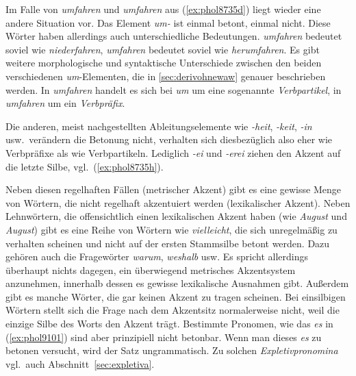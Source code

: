 \begin{exe}
  \ex\label{ex:fokuskomp}
  \begin{xlist}
  \end{xlist}
\end{exe}

Im Falle von \textit{\Akz umfahren} und \textit{um\Akz fahren} aus (\ref{ex:phol8735d}) liegt wieder eine andere Situation vor.
Das Element \textit{um-} ist einmal betont, einmal nicht.
Diese Wörter haben allerdings auch unterschiedliche Bedeutungen.
\textit{\Akz umfahren} bedeutet soviel wie \textit{niederfahren}, \textit{um\Akz fahren} bedeutet soviel wie \textit{herumfahren}.
Es gibt weitere morphologische und syntaktische Unterschiede zwischen den beiden verschiedenen \textit{um}-Elementen, die in \ref{sec:derivohnewaw} genauer beschrieben werden.
In \textit{\Akz umfahren} handelt es sich bei \textit{um} um eine sogenannte \textit{Verbpartikel}, in \textit{um\Akz fahren} um ein \textit{Verbpräfix}.


Die anderen, meist nachgestellten Ableitungselemente wie \textit{-heit}, \textit{-keit}, \textit{-in} usw.\ verändern die Betonung nicht, verhalten sich diesbezüglich also eher wie Verbpräfixe als wie Verbpartikeln.
Lediglich \textit{-ei} und \textit{-erei} ziehen den Akzent auf die letzte Silbe, vgl.\ (\ref{ex:phol8735h}).

Neben diesen regelhaften Fällen (metrischer Akzent) gibt es eine gewisse Menge von Wörtern, die nicht regelhaft akzentuiert werden (lexikalischer Akzent).
Neben Lehnwörtern, die offensichtlich einen lexikalischen Akzent haben (wie \textit{\Akz August} und \textit{Au\Akz gust}) gibt es eine Reihe von Wörtern wie \textit{vie\Akz lleicht}, die sich unregelmäßig zu verhalten scheinen und nicht auf der ersten Stammsilbe betont werden.
Dazu gehören auch die Fragewörter \textit{wa\Akz rum}, \textit{wes\Akz halb} usw.
Es spricht allerdings überhaupt nichts dagegen, ein überwiegend metrisches Akzentsystem anzunehmen, innerhalb dessen es gewisse lexikalische Ausnahmen gibt.
Außerdem gibt es manche Wörter, die gar keinen Akzent zu tragen scheinen.
Bei einsilbigen Wörtern stellt sich die Frage nach dem Akzentsitz normalerweise nicht, weil die einzige Silbe des Worts den Akzent trägt.
Bestimmte Pronomen, wie das \textit{es} in (\ref{ex:phol9101}) sind aber prinzipiell nicht betonbar.
Wenn man dieses \textit{es} zu betonen versucht, wird der Satz ungrammatisch.
Zu solchen \textit{Expletivpronomina} vgl.\ auch Abschnitt~\ref{sec:expletiva}.\label{abs:expletbeton}

